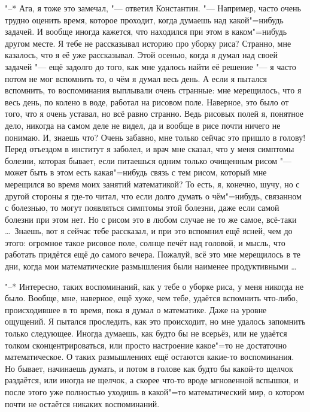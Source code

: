 "--* Ага, я тоже это замечал, "--- ответил Константин.
"--- Например, часто очень трудно оценить время, которое проходит, когда думаешь
над какой"=нибудь задачей.
И вообще иногда кажется, что находился при этом в каком"=нибудь другом месте.
Я тебе не рассказывал историю про уборку риса?
Странно, мне казалось, что я её уже рассказывал.
Этой осенью, когда я думал над своей задачей "--- ещё задолго до того, как мне
удалось найти её решение "--- я часто потом не мог вспомнить то, о чём я думал
весь день.
А если я пытался вспомнить, то воспоминания выплывали очень странные: мне
мерещилось, что я весь день, по колено в воде, работал на рисовом поле.
Наверное, это было от того, что я очень уставал, но всё равно странно.
Ведь рисовых полей я, понятное дело, никогда на самом деле не видел, да и вообще
в рисе почти ничего не понимаю.
И, знаешь что?
Очень забавно, мне только сейчас это пришло в голову!
Перед отъездом в институт я заболел, и врач мне сказал, что у меня симптомы
болезни, которая бывает, если питаешься одним только очищенным рисом "--- может
быть в этом есть какая"=нибудь связь с тем рисом, который мне мерещился во время
моих занятий математикой?
То есть, я, конечно, шучу, но с другой стороны я где-то читал, что если долго
думать о чём"=нибудь, связанном с болезнью, то могут появляться симптомы этой
болезни, даже если самой болезни при этом нет.
Но с рисом это в любом случае не то же самое, всё-таки \ldots\
Знаешь, вот я сейчас тебе рассказал, и при это вспомнил ещё ясней, чем до этого:
огромное такое рисовое поле, солнце печёт над головой, и мысль, что работать
придётся ещё до самого вечера.
Пожалуй, всё это мне мерещилось в те дни, когда мои математические размышления
были наименее продуктивными \ldots

"--* Интересно, таких воспоминаний, как у тебе о уборке риса, у меня никогда не
было.
Вообще, мне, наверное, ещё хуже, чем тебе, удаётся вспомнить что-либо,
происходившее в то время, пока я думал о математике.
Даже на уровне ощущений.
Я пытался проследить, как это происходит, но мне удалось запомнить только
следующее.
Иногда думаешь, как будто бы не всерьёз, или не удаётся толком
сконцентрироваться, или просто настроение какое"=то не достаточно
математическое.
О таких размышлениях ещё остаются какие-то воспоминания.
Но бывает, начинаешь думать, и потом в голове как будто бы какой-то щелчок
раздаётся, или иногда не щелчок, а скорее что-то вроде мгновенной вспышки, и
после этого уже полностью уходишь в какой"=то математический мир, о котором
почти не остаётся никаких воспоминаний.

